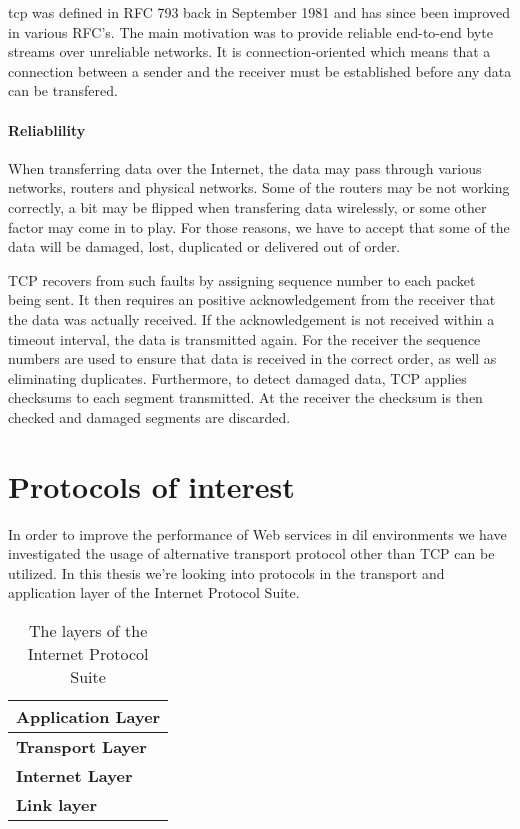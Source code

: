 \gls{tcp} was defined in RFC 793 back in September 1981 and has since been
improved in various RFC's. The main motivation was to provide reliable
end-to-end byte streams over unreliable networks. It is connection-oriented
which means that a connection between a sender and the receiver must be
established before any data can be transfered.

\paragraph{Reliablility}

When transferring data over the Internet, the data may pass through various
networks, routers and physical networks. Some of the routers may be not working
correctly, a bit may be flipped when transfering data wirelessly, or some other
factor may come in to play. For those reasons, we have to accept that some of
the data will be damaged, lost, duplicated or delivered out of order.

TCP recovers from such faults by assigning sequence number to each packet being
sent. It then requires an positive acknowledgement from the receiver that the
data was actually received. If the acknowledgement is not received within a
timeout interval, the data is transmitted again. For the receiver the sequence
numbers are used to ensure that data is received in the correct order, as well
as eliminating duplicates. Furthermore, to detect damaged data, TCP applies
checksums to each segment transmitted. At the receiver the checksum is then
checked and damaged segments are discarded.






\section{Protocols of interest}


In order to improve the performance of Web services in \gls{dil} environments we
have investigated the usage of alternative transport protocol other than TCP can
be utilized. In this thesis we're looking into protocols in the transport and
application layer of the Internet Protocol Suite\cite{rfc-1122}.

\begin{table}[h]
\begin{tabularx}{\textwidth}{| X |}
\hline
  \textbf{Application Layer} \\ \hline
  \textbf{Transport Layer} \\ \hline
  \textbf{Internet Layer} \\ \hline
  \textbf{Link layer} \\ \hline
\end{tabularx}
\caption{The layers of the Internet Protocol Suite}
\end{table}


